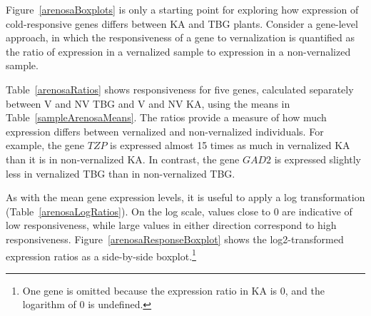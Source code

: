 Figure~\ref{arenosaBoxplots} is only a starting point for exploring how expression of cold-responsive genes differs between KA and TBG plants. Consider a gene-level approach, in which the responsiveness of a gene to vernalization is quantified as the ratio of expression in a vernalized sample to expression in a non-vernalized sample. 

Table~\ref{arenosaRatios} shows responsiveness for five genes, calculated separately between V and NV TBG and V and NV KA, using the means in Table~\ref{sampleArenosaMeans}. The ratios provide a measure of how much expression differs between vernalized and non-vernalized individuals. For example, the gene $TZP$ is expressed almost 15 times as much in vernalized KA than it is in non-vernalized KA. In contrast, the gene $GAD2$ is expressed slightly less in vernalized TBG than in non-vernalized TBG.

As with the mean gene expression levels, it is useful to apply a log transformation (Table~\ref{arenosaLogRatios}). On the log scale, values close to 0 are indicative of low responsiveness, while large values in either direction correspond to high responsiveness. Figure~\ref{arenosaResponseBoxplot} shows the log2-transformed expression ratios as a side-by-side boxplot.\footnote{One gene is omitted because the expression ratio in KA is 0, and the logarithm of 0 is undefined.}

\begin{table}[h]
	\centering
	\caption{ Ratio of mean expression in vernalized individuals to mean expression in non-vernalized individuals.  Log2-transformation of expression ratios in Table~\ref{arenosaRatios}.}
	\label{arenosaRatioTables}
\end{table}


